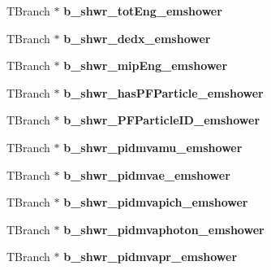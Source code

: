 \begin{DoxyCompactItemize}
\item 
\hypertarget{classanatree_a6b521c29eb6389af9ad60e74a7d22fd4}{T\-Branch $\ast$ {\bfseries b\-\_\-shwr\-\_\-tot\-Eng\-\_\-emshower}}\label{classanatree_a6b521c29eb6389af9ad60e74a7d22fd4}

\item 
\hypertarget{classanatree_a9b2ea44152c0c699e9b4132bfcd6f902}{T\-Branch $\ast$ {\bfseries b\-\_\-shwr\-\_\-dedx\-\_\-emshower}}\label{classanatree_a9b2ea44152c0c699e9b4132bfcd6f902}

\item 
\hypertarget{classanatree_a585bc84a73ab3d2aa971eb6ba987cd36}{T\-Branch $\ast$ {\bfseries b\-\_\-shwr\-\_\-mip\-Eng\-\_\-emshower}}\label{classanatree_a585bc84a73ab3d2aa971eb6ba987cd36}

\item 
\hypertarget{classanatree_a8f344f49b8aa1d29c0b8e546ccccb9df}{T\-Branch $\ast$ {\bfseries b\-\_\-shwr\-\_\-has\-P\-F\-Particle\-\_\-emshower}}\label{classanatree_a8f344f49b8aa1d29c0b8e546ccccb9df}

\item 
\hypertarget{classanatree_a122fe315b2ea167d500d25ee92317d8a}{T\-Branch $\ast$ {\bfseries b\-\_\-shwr\-\_\-\-P\-F\-Particle\-I\-D\-\_\-emshower}}\label{classanatree_a122fe315b2ea167d500d25ee92317d8a}

\item 
\hypertarget{classanatree_afd1eacf09d50860c598a41db1dc809ac}{T\-Branch $\ast$ {\bfseries b\-\_\-shwr\-\_\-pidmvamu\-\_\-emshower}}\label{classanatree_afd1eacf09d50860c598a41db1dc809ac}

\item 
\hypertarget{classanatree_a33729e5a8055bd33e5c40fb5cd312891}{T\-Branch $\ast$ {\bfseries b\-\_\-shwr\-\_\-pidmvae\-\_\-emshower}}\label{classanatree_a33729e5a8055bd33e5c40fb5cd312891}

\item 
\hypertarget{classanatree_a68907c0bbc14bd07e613a36f052ed895}{T\-Branch $\ast$ {\bfseries b\-\_\-shwr\-\_\-pidmvapich\-\_\-emshower}}\label{classanatree_a68907c0bbc14bd07e613a36f052ed895}

\item 
\hypertarget{classanatree_acddee7dc77af04ebd4f7340a6c623cd8}{T\-Branch $\ast$ {\bfseries b\-\_\-shwr\-\_\-pidmvaphoton\-\_\-emshower}}\label{classanatree_acddee7dc77af04ebd4f7340a6c623cd8}

\item 
\hypertarget{classanatree_a1c312b7528dd965e60e966958df44a75}{T\-Branch $\ast$ {\bfseries b\-\_\-shwr\-\_\-pidmvapr\-\_\-emshower}}\label{classanatree_a1c312b7528dd965e60e966958df44a75}


\end{DoxyCompactItemize}
